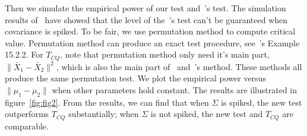 \documentclass[review]{elsarticle}
\theoremstyle{plain}
\theoremstyle{definition}
\theoremstyle{remark}
\begin{document}
Then we simulate the empirical power of our test and~\cite{Chen2010A}'s test.
The simulation results of~\cite{Ma2015A} have showed that the level of the~\cite{Chen2010A}'s test can't be guaranteed when covariance is spiked.
To be fair, we use permutation method to compute critical value.
Permutation method can produce an exact test procedure, see~\cite{Lehmann}'s Example 15.2.2.\@
For $T_{CQ}$, note that permutation method only need it's main part, $\|\bar{X}_1-\bar{X}_2\|^2$, which is also the main part of~\cite{Bai1996Efiect} and~\cite{Ma2015A}'s method.
These methods all produce the same permutation test.
We plot the empirical power versus $\|\mu_1-\mu_2\|$ when other parameters hold constant.
The results are illustrated in figure~\ref{fig:fig2}.
From the results, we can find that when $\Sigma$ is spiked, the new test outperforms $T_{CQ}$ substantially; when $\Sigma$ is not spiked, the new test and $T_{CQ}$ are comparable.
\end{document}
